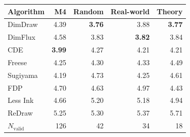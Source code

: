 \begin{tabular}{lrrrr}
\toprule
Algorithm & M4 & Random & Real-world & Theory \\
\midrule
DimDraw & 4.39 & \textbf{3.76} & 3.88 & \textbf{3.77} \\
DimFlux & 4.58 & 3.83 & \textbf{3.82} & 3.84 \\
CDE & \textbf{3.99} & 4.27 & 4.21 & 4.21 \\
Freese & 4.25 & 4.30 & 4.33 & 4.49 \\
Sugiyama & 4.19 & 4.73 & 4.25 & 4.61 \\
FDP & 4.70 & 4.63 & 4.97 & 4.43 \\
Less Ink & 4.66 & 5.20 & 5.18 & 4.94 \\
ReDraw & 5.25 & 5.30 & 5.37 & 5.71 \\
\midrule
$N_{\mathrm{valid}}$ & 126 & 42 & 34 & 18 \\
\bottomrule
\end{tabular}

